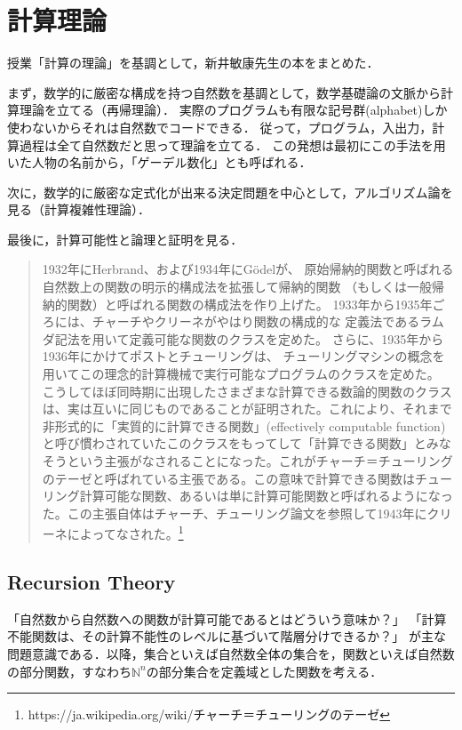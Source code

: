 \documentclass[uplatex, dvipdfmx]{jsreport}
\begin{document}
\part{計算理論}
\begin{screen}
    授業「計算の理論」を基調として，新井敏康先生の本をまとめた．

    まず，数学的に厳密な構成を持つ自然数を基調として，数学基礎論の文脈から計算理論を立てる（再帰理論）．
    実際のプログラムも有限な記号群(alphabet)しか使わないからそれは自然数でコードできる．
    従って，プログラム，入出力，計算過程は全て自然数だと思って理論を立てる．
    この発想は最初にこの手法を用いた人物の名前から，「ゲーデル数化」とも呼ばれる．

    次に，数学的に厳密な定式化が出来る決定問題を中心として，アルゴリズム論を見る（計算複雑性理論）．

    最後に，計算可能性と論理と証明を見る．
\end{screen}
\begin{quote}
    1932年にHerbrand、および1934年にGödelが、
    原始帰納的関数と呼ばれる自然数上の関数の明示的構成法を拡張して帰納的関数
    （もしくは一般帰納的関数）と呼ばれる関数の構成法を作り上げた。
    1933年から1935年ごろには、チャーチやクリーネがやはり関数の構成的な
    定義法であるラムダ記法を用いて定義可能な関数のクラスを定めた。
    さらに、1935年から1936年にかけてポストとチューリングは、
    チューリングマシンの概念を用いてこの理念的計算機械で実行可能なプログラムのクラスを定めた。
    こうしてほぼ同時期に出現したさまざまな計算できる数論的関数のクラスは、実は互いに同じものであることが証明された。これにより、それまで非形式的に「実質的に計算できる関数」(effectively computable function) と呼び慣わされていたこのクラスをもってして「計算できる関数」とみなそうという主張がなされることになった。これがチャーチ＝チューリングのテーゼと呼ばれている主張である。この意味で計算できる関数はチューリング計算可能な関数、あるいは単に計算可能関数と呼ばれるようになった。この主張自体はチャーチ、チューリング論文を参照して1943年にクリーネによってなされた。\footnote{https://ja.wikipedia.org/wiki/チャーチ＝チューリングのテーゼ}
\end{quote}

\chapter{Recursion Theory}
「自然数から自然数への関数が計算可能であるとはどういう意味か？」
「計算不能関数は、その計算不能性のレベルに基づいて階層分けできるか？」
が主な問題意識である．以降，集合といえば自然数全体の集合を，関数といえば自然数の部分関数，すなわち$\mathbb{N}^n$の部分集合を定義域とした関数を考える．
\end{document}
